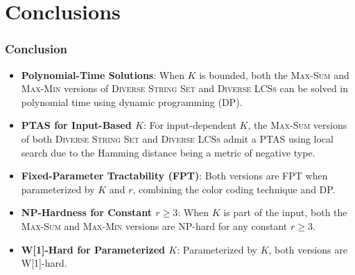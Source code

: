 \documentclass{beamer}
\begin{document}
\section{Conclusions}
\begin{frame}
    \frametitle{Conclusion}

    \begin{itemize}
        \item \textbf{Polynomial-Time Solutions}: When \( K \) is bounded, both the \textsc{Max-Sum} and \textsc{Max-Min} versions of \textsc{Diverse String Set} and \textsc{Diverse LCSs} can be solved in polynomial time using dynamic programming (DP).
        \item \textbf{PTAS for Input-Based \( K \)}: For input-dependent \( K \), the \textsc{Max-Sum} versions of both \textsc{Diverse String Set} and \textsc{Diverse LCSs} admit a PTAS using local search due to the Hamming distance being a metric of negative type.
        \item \textbf{Fixed-Parameter Tractability (FPT)}: Both versions are FPT when parameterized by \( K \) and \( r \), combining the color coding technique and DP.
        \item \textbf{NP-Hardness for Constant \( r \ge 3 \)}: When \( K \) is part of the input, both the \textsc{Max-Sum} and \textsc{Max-Min} versions are NP-hard for any constant \( r \ge 3 \).
        \item \textbf{W[1]-Hard for Parameterized \( K \)}: Parameterized by \( K \), both versions are W[1]-hard.
    \end{itemize}

\end{frame}






\end{document}
